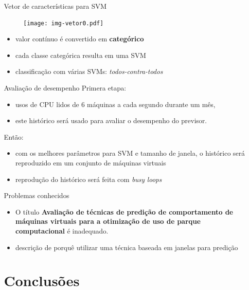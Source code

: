 \documentclass{beamer}
\begin{document}
\begin{frame}{Vetor de características para SVM}
\begin{figure}
\centering
\texttt{[image: img-vetor0.pdf]}
\end{figure}
\begin{itemize}
\item valor contínuo é convertido em \textbf{categórico}
\item cada classe categórica resulta em uma SVM
\item classificação com várias SVMs: \emph{todos-contra-todos}
\end{itemize}
\end{frame}

\begin{frame}{Avaliação de desempenho}
Primera etapa:
\begin{itemize}
\item usos de CPU lidos de 6 máquinas a cada segundo durante um mês,
\item este histórico será usado para avaliar o desempenho do previsor.
\end{itemize}
Então:
\begin{itemize}
\item com os melhores parâmetros para SVM e tamanho de janela, o histórico
será reproduzido em um conjunto de máquinas virtuais
\item reprodução do histórico será feita com \emph{busy loops}
\end{itemize}
\end{frame}

\begin{frame}{Problemas conhecidos}
\begin{itemize}
  \item O título \textbf{Avaliação de técnicas de predição de comportamento
        de máquinas virtuais para a otimização de uso de parque computacional} é
        inadequado.
  \item descrição de porquê utilizar uma técnica baseada em janelas para
        predição
\end{itemize}
\end{frame}

\section{Conclusões}
\end{document}
